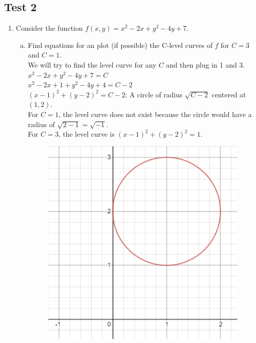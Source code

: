 \subsection{Test 2}
\begin{enumerate}
	\item Consider the function $f(x,y) = x^2 - 2x + y^2 - 4y + 7$.\\
	\begin{enumerate}[a.]
		\item Find equations for an plot (if possible) the C-level curves of $f$ for $C = 3$ and $C = 1$.\\
		\indent
		We will try to find the level curve for any $C$ and then plug in 1 and 3.\\
		$x^2 - 2x + y^2 - 4y + 7 = C$\\
		$x^2 - 2x + 1 + y^2 - 4y + 4 = C-2$\\
		$(x-1)^2 + (y-2)^2 = C-2$: A circle of radius $\sqrt{C-2}$ centered at $(1,2)$.\\
		For $C = 1$, the level curve does not exist because the circle would have a radius of $\sqrt{2-1} = \sqrt{-1}$.\\
		For $C = 3$, the level curve is $(x-1)^2 + (y-2)^2 = 1$.
		
		\begin{figure}[h]
			\centering
			\includegraphics[scale=.24]{Images/additionalMaterials/test2_circle}
		\end{figure}
		

\end{enumerate}
\end{enumerate}
